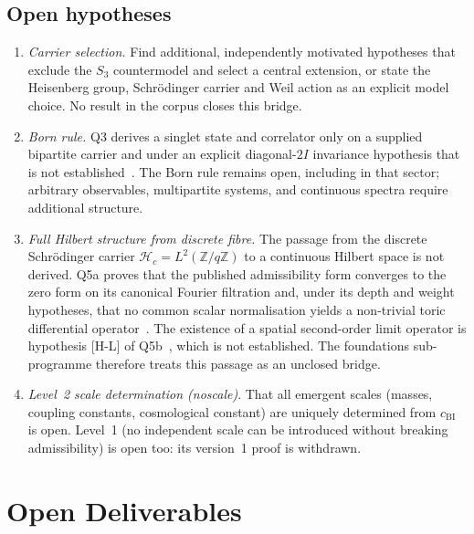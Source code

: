 \documentclass[11pt,a4paper]{article}
\theoremstyle{definition}
\newcommand{\cchi}{c_{\mathrm{BI}}}
\newcommand{\Hc}{\mathcal{H}_c}
\begin{document}
    \subsection{Open hypotheses}
      \label{sec:open-hyp}

      \begin{enumerate}
        \item \textit{Carrier selection.}
        Find additional, independently motivated hypotheses that exclude the $S_3$
        countermodel and select a central extension, or state the Heisenberg group, Schr\"odinger
        carrier and Weil action as an explicit model choice.  No result in the corpus closes this bridge.

        \item \textit{Born rule.}
        Q3 derives a singlet state and correlator only on a supplied bipartite carrier and under an
        explicit diagonal-$2I$ invariance hypothesis that is not established~\cite{Beau2026q3}.
        The Born rule remains open, including in that sector; arbitrary observables,
        multipartite systems, and continuous spectra require additional structure.

        \item \textit{Full Hilbert structure from discrete fibre.}
        The passage from the discrete Schr\"odinger carrier
        $\Hc=L^2(\mathbb{Z}/q\mathbb{Z})$ to a continuous
        Hilbert space is not derived.
        Q5a proves that the published admissibility form converges to the zero form on its canonical
        Fourier filtration and, under its depth and weight hypotheses, that no common scalar
        normalisation yields a non-trivial toric differential operator~\cite{Beau2026q5a}.
        The existence of a spatial second-order limit operator is hypothesis [H-L] of
        Q5b~\cite{Beau2026q5b}, which is not established.
        The foundations sub-programme therefore treats this passage as an unclosed bridge.

        \item \textit{Level~2 scale determination (noscale)}.
        That all emergent scales (masses, coupling constants, cosmological constant) are
        uniquely determined from $\cchi$ is open.
        Level~1 (no independent scale can be introduced without breaking admissibility) is open
        too: its version~1 proof is withdrawn.
      \end{enumerate}

  \section{Open Deliverables}
    \label{sec:open}
\end{document}
